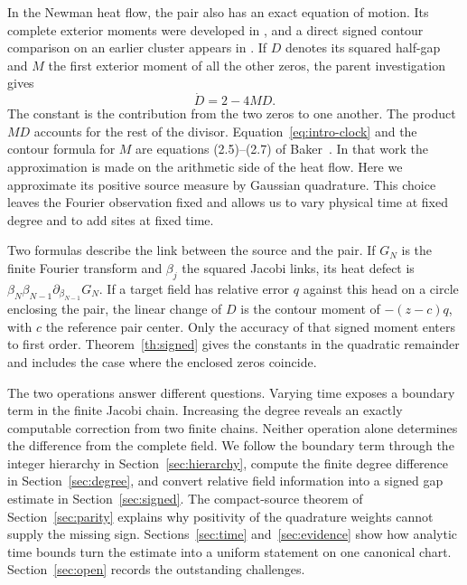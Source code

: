 \documentclass[11pt,letterpaper]{article}
\numberwithin{equation}{section}
\theoremstyle{definition}\newtheorem{definition}[theorem]{Definition}
\theoremstyle{remark}\newtheorem{remark}[theorem]{Remark}
\begin{document}
In the Newman heat flow, the pair also has an exact equation of motion. Its complete exterior moments were developed in \cite{cm}, and a direct signed contour comparison on an earlier cluster appears in \cite{gt}. If \(D\) denotes its squared half-gap and \(M\) the first exterior moment of all the other zeros, the parent investigation gives
\begin{equation}
 \dot D=2-4MD . \label{eq:intro-clock}
\end{equation}
The constant is the contribution from the two zeros to one another. The product \(MD\) accounts for the rest of the divisor. Equation~\eqref{eq:intro-clock} and the contour formula for \(M\) are equations (2.5)--(2.7) of Baker~\cite{agc}. In that work the approximation is made on the arithmetic side of the heat flow. Here we approximate its positive source measure by Gaussian quadrature. This choice leaves the Fourier observation fixed and allows us to vary physical time at fixed degree and to add sites at fixed time.

Two formulas describe the link between the source and the pair. If \(G_N\) is the finite Fourier transform and \(\beta_j\) the squared Jacobi links, its heat defect is \(\beta_N\beta_{N-1}\partial_{\beta_{N-1}}G_N\). If a target field has relative error \(q\) against this head on a circle enclosing the pair, the linear change of \(D\) is the contour moment of \(-(z-c)q\), with \(c\) the reference pair center. Only the accuracy of that signed moment enters to first order. Theorem~\ref{th:signed} gives the constants in the quadratic remainder and includes the case where the enclosed zeros coincide.

The two operations answer different questions. Varying time exposes a boundary term in the finite Jacobi chain. Increasing the degree reveals an exactly computable correction from two finite chains. Neither operation alone determines the difference from the complete field. We follow the boundary term through the integer hierarchy in Section~\ref{sec:hierarchy}, compute the finite degree difference in Section~\ref{sec:degree}, and convert relative field information into a signed gap estimate in Section~\ref{sec:signed}. The compact-source theorem of Section~\ref{sec:parity} explains why positivity of the quadrature weights cannot supply the missing sign. Sections~\ref{sec:time} and~\ref{sec:evidence} show how analytic time bounds turn the estimate into a uniform statement on one canonical chart. Section~\ref{sec:open} records the outstanding challenges.










\end{document}

